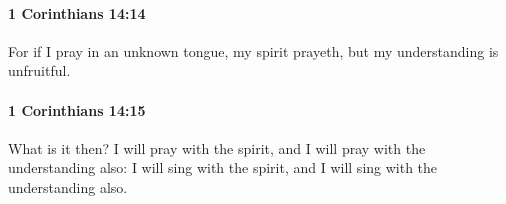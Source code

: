 		\paragraph{1 Corinthians 14:14} %
			\label{1CORINTHIANS-14-14}

			For if I pray in an unknown tongue, my spirit prayeth, but my understanding is unfruitful.

			\begin{framed}
				\scriptsize
				\begin{compactdesc}
					\item[SBLG] 
				\end{compactdesc}
			\end{framed}

		\paragraph{1 Corinthians 14:15} %
			\label{1CORINTHIANS-14-15}

			What is it then?  I will pray with the spirit, and I will pray with the understanding also: I will sing with the spirit, and I will sing with the understanding also.

